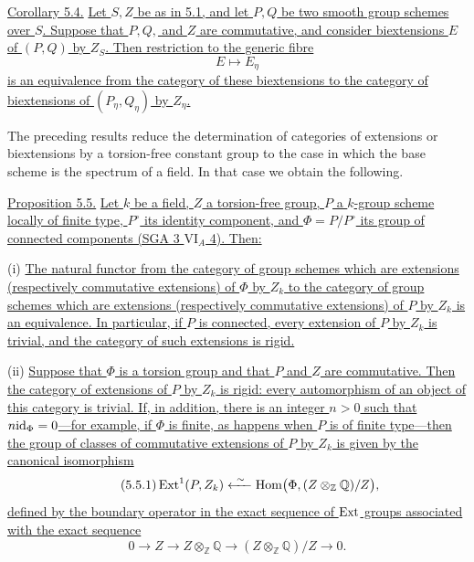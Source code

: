\medskip
\noindent\underline{Corollary 5.4.}  \underline{Let $S,Z$ be as in
5.1, and let $P,Q$ be two smooth group schemes over $S$.  Suppose that
$P,Q,$ and $Z$ are commutative, and consider biextensions $E$ of
$(P,Q)$ by $Z_S$.  Then restriction to the generic fibre}
\[
 E\longmapsto E_\eta
\]
\underline{is an equivalence from the category of these biextensions
to the category of biextensions of $(P_\eta,Q_\eta)$ by $Z_\eta$.}

The preceding results reduce the determination of categories of
extensions or biextensions by a torsion-free constant group to the
case in which the base scheme is the spectrum of a field.  In that
case we obtain the following.

\medskip
\noindent\underline{Proposition 5.5.}  \underline{Let $k$ be a field,
$Z$ a torsion-free group, $P$ a $k$-group scheme locally of finite
type, $P^\circ$ its identity component, and
$\Phi=P/P^\circ$ its group of connected components (SGA 3
$\mathrm{VI}_A$ 4).  Then:}

\smallskip
\noindent (i) \underline{The natural functor from the category of group
schemes which are extensions (respectively commutative extensions) of
$\Phi$ by $Z_k$ to the category of group schemes which are extensions
(respectively commutative extensions) of $P$ by $Z_k$ is an
equivalence.  In particular, if $P$ is connected, every extension of
$P$ by $Z_k$ is trivial, and the category of such extensions is
rigid.}

\smallskip
\noindent (ii) \underline{Suppose that $\Phi$ is a torsion group and
that $P$ and $Z$ are commutative.  Then the category of extensions of
$P$ by $Z_k$ is rigid: every automorphism of an object of this
category is trivial.  If, in addition, there is an integer $n>0$ such
that $n\mathrm{id}_\Phi=0$---for example, if $\Phi$ is finite, as happens when
$P$ is of finite type---then the group of classes of commutative
extensions of $P$ by $Z_k$ is given by the canonical isomorphism}
\begin{equation}\tag{5.5.1}
 \operatorname{Ext}^1(P,Z_k)
 \xleftarrow{\ \sim\ }
 \operatorname{Hom}\bigl(\Phi,(Z\otimes_{\mathbb Z}\mathbb Q)/Z\bigr),
\end{equation}
\underline{defined by the boundary operator in the exact sequence of
$\operatorname{Ext}$ groups associated with the exact sequence}
\begin{equation}\tag{5.5.2}
 0\longrightarrow Z\longrightarrow Z\otimes_{\mathbb Z}\mathbb Q
 \longrightarrow (Z\otimes_{\mathbb Z}\mathbb Q)/Z
 \longrightarrow 0.
\end{equation}

